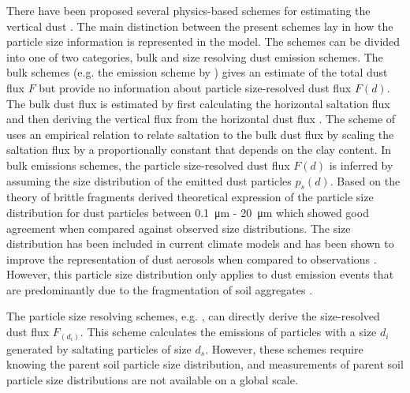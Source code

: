 There have been proposed several physics-based schemes for estimating the vertical dust \parencite{MB95_dust_emission,alfaro2001modeling,shao2004simplification}. The main distinction between the present schemes lay in how the particle size information is represented in the model. The schemes can be divided into one of two categories, bulk and size resolving dust emission schemes. The bulk schemes (e.g. the emission scheme by \parencite{MB95_dust_emission}) gives an estimate of the total dust flux $F$ but provide no information about particle size-resolved dust flux $F(d)$. The bulk dust flux is estimated by first calculating the horizontal saltation flux and then deriving the vertical flux from the horizontal dust flux \parencite{tegen2014numerical}. The scheme of \textcite{MB95_dust_emission} uses an empirical relation to relate saltation to the bulk dust flux by scaling the saltation flux by a proportionally constant that depends on the clay content. In bulk emissions schemes, the particle size-resolved dust flux $F(d)$ is inferred by assuming the size distribution of the emitted dust particles $p_s(d)$. Based on the theory of brittle fragments \textcite{kok_scaling_2011} derived theoretical expression of the particle size distribution for dust particles between \SI{0.1}{\micro\metre} - \SI{20}{\micro\metre} which showed good agreement when compared against observed size distributions. The \textcite{kok_scaling_2011} size distribution has been included in current climate models and has been shown to improve the representation of dust aerosols when compared to observations \parencite{johnson2012global}. However, this particle size distribution only applies to dust emission events that are predominantly due to the fragmentation of soil aggregates \parencite{kok2012physics}.


The particle size resolving schemes, e.g. \textcite{shao2004simplification}, can directly derive the size-resolved dust flux $F_(d_i)$. This scheme calculates the emissions of particles with a size $d_i$ generated by saltating particles of size $d_s$. However, these schemes require knowing the parent soil particle size distribution, and measurements of parent soil particle size distributions are not available on a global scale.

